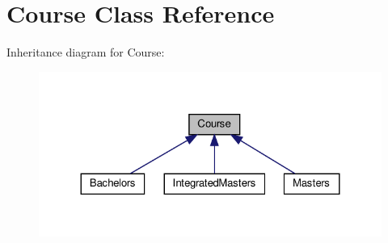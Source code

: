 \hypertarget{classCourse}{}\section{Course Class Reference}
\label{classCourse}


Inheritance diagram for Course\+:\nopagebreak
\begin{figure}[H]
\begin{center}
\leavevmode
\includegraphics[width=324pt]{classCourse__inherit__graph}
\end{center}
\end{figure}
